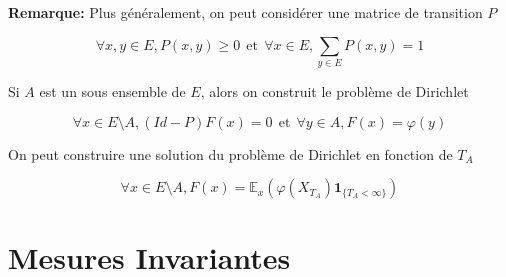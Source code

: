 \documentclass[10pt,a4paper,oneside]{article}
\begin{document}
\begin{itemize}
\textbf{Remarque:} Plus généralement, on peut considérer une matrice de transition $P$

\[ \forall x,y \in E, P(x,y) \geq 0\ \ \text{et}\ \ \forall x \in E, \sum_{y \in E} P(x,y) = 1 \]

Si $A$ est un sous ensemble de $E$, alors on construit le problème de Dirichlet

\[ \forall x \in E \setminus A, (Id - P)F(x) = 0\ \ \text{et}\ \ \forall y \in A, F(x) = \varphi(y) \]

On peut construire une solution du problème de Dirichlet en fonction de $T_A$

\[ \forall x \in E \setminus A, F(x) = \mathbb{E}_x \left( \varphi(X_{T_A}) \textbf{1}_{ \{ T_A < \infty \} } \right) \]

\end{itemize}

\section{Mesures Invariantes}
\end{document}
